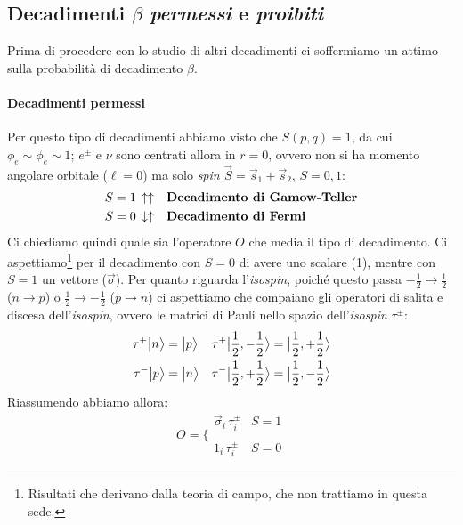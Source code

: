 \subsection{Decadimenti $\beta$ \textit{permessi} e \textit{proibiti}}
Prima di procedere con lo studio di altri decadimenti ci soffermiamo un attimo sulla probabilità di decadimento $\beta$.
\paragraph{Decadimenti permessi} Per questo tipo di decadimenti abbiamo visto che $S(p,q)=1$, da cui $\phi_e\sim\phi_e\sim 1$; $e^\pm$ e $\nu$ sono centrati allora in $r=0$, ovvero non si ha momento angolare orbitale ($\ell = 0$) ma solo \textit{spin} $\vec{S} = \vec{s}_1 + \vec{s}_2$, $S=0,1$:
\begin{displaymath}
\begin{aligned}
S = 1&\,\uparrow\uparrow & &\text{\textbf{Decadimento di Gamow-Teller}}\index{decadimento di!Gamow-Teller} \\
S = 0&\,\downarrow\uparrow & &\text{\textbf{Decadimento di Fermi}}\index{decadimento di!Fermi} 
\end{aligned}
\end{displaymath}
Ci chiediamo quindi quale sia l'operatore $O$ che media il tipo di decadimento. Ci aspettiamo\footnote{Risultati che derivano dalla teoria di campo, che non trattiamo in questa sede.} per il decadimento con $S=0$ di avere uno scalare (1), mentre con $S=1$ un vettore ($\vec{\sigma}$). Per quanto riguarda l'\textit{isospin}, poiché questo passa $-\frac{1}{2} \to \frac{1}{2}$ ($n\to p$) o $\frac{1}{2} \to -\frac{1}{2}$ ($p\to n$)  ci aspettiamo che compaiano gli operatori di salita e discesa dell'\textit{isospin}, ovvero le matrici di Pauli nello spazio dell'\textit{isospin} $\tau^\pm$:
\begin{displaymath}
\begin{aligned}
    \tau^+\bigl | n \bigr \rangle&=\bigl | p \bigr \rangle & \tau^+ \bigl | \frac{1}{2},-\frac{1}{2} \bigr \rangle &=   \bigl | \frac{1}{2},+\frac{1}{2} \bigr \rangle\\
    \tau^-\bigl | p \bigr \rangle&=\bigl | n \bigr \rangle & \tau^- \bigl | \frac{1}{2},+\frac{1}{2} \bigr \rangle &=  \bigl | \frac{1}{2},-\frac{1}{2} \bigr \rangle
\end{aligned}
\end{displaymath}
Riassumendo abbiamo allora:
\begin{displaymath}
O = \Biggl \{
\begin{array}{ll}
    \vec{\sigma}_i \, \tau^\pm_i & S=1\\
     & \\
    1_i \, \tau^\pm_i & S=0 
\end{array}
\end{displaymath}
